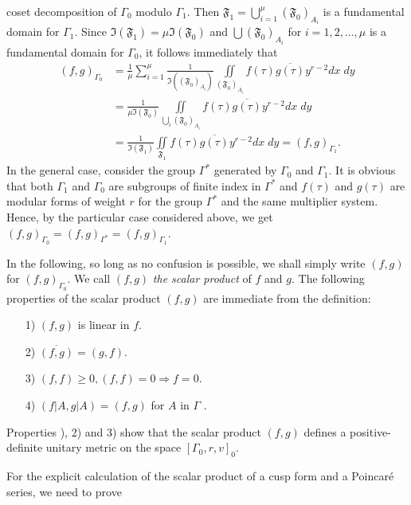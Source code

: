 coset decomposition of $\Gamma_0$ modulo $\Gamma_1$. Then
$\mathfrak{F}_1 = \bigcup^{\mu}_{i=1}(\mathfrak{F}_0)_{A_i}$
\pageoriginale is a fundamental domain for $\Gamma_1$. Since
$\mathfrak{I}(\mathfrak{F}_1)=\mu\mathfrak{I}(\mathfrak{F}_0)$ and
$\bigcup(\mathfrak{F}_0)_{A_i}$ for $i=1,2,\ldots,\mu$ is a
fundamental domain for $\Gamma_0$, it follows immediately that 
\begin{align*}
  (f,g)_{\Gamma_0} & = \frac{1}{\mu} \sum\limits^\mu_{i=1}
  \frac{1}{\mathfrak{I}((\mathfrak{F_0})_{A_i})}
  \iint\limits_{(\mathfrak{F}_0)_{A_i}} f(\tau) \overline{g(\tau)}
  y^{r-2} dx \; dy\\
& = \frac{1}{\mu \mathfrak{I}(\mathfrak{F}_0)}
   \iint\limits_{\bigcup\limits_i(\mathfrak{F}_0)_{A_i}} f(\tau)
  \overline{g(\tau)} y^{r-2} dx \; dy\\
& = \frac{1}{\mathfrak{I}(\mathfrak{F}_1)}
   \iint\limits_{\mathfrak{F}_1} f(\tau) \overline{g(\tau)}
  y^{r-2} dx \; dy =(f,g)_{\Gamma_1}.
\end{align*}
In the general case, consider the group $\Gamma^{\ast}$ generated by
$\Gamma_0$ and $\Gamma_1$. It is obvious that both $\Gamma_1$ and
$\Gamma_0$ are subgroups of finite index in $\Gamma^{\ast}$ and
$f(\tau)$ and $g(\tau)$ are modular forms of weight $r$ for the group
$\Gamma^{\ast}$ and the same multiplier system. Hence, by the
particular case considered above, we get $(f,g)_{\Gamma_0} =
(f,g)_{\Gamma^{\ast}} = (f,g)_{\Gamma_1}$. 

In the following, so long as no confusion is possible, we shall simply
write $(f,g)$ for $(f,g)_{\Gamma_0}$. We call $(f,g)$ \textit{the
  scalar product} of $f$ and $g$. The following properties of the
scalar product $(f,g)$ are immediate from the definition:
\begin{itemize}
\item[1)] $(f,g)$ is linear in $f$.

\item[2)] $\overline{(f,g)}=(g,f)$.

\item[3)] $(f,f) \geq 0, (f,f)=0\Longrightarrow f=0$.

\item[4)] $(f|A,g|A) =(f,g)$ for $A$ in $\Gamma$ .
\end{itemize}

Properties ), 2) and 3) show that the scalar product
$(f,g)$ defines a positive-definite unitary metric on the space
$[\Gamma_0, r, v]_0$.

For the explicit calculation of the scalar product of a cusp form and
a Poincar\'e series, we need to prove 

